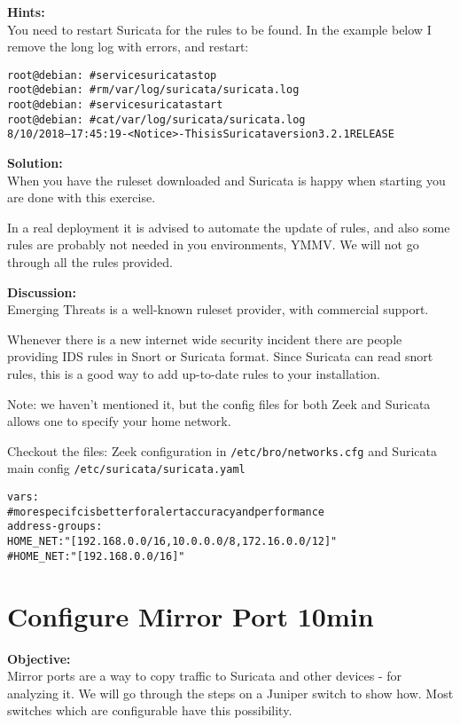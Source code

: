 \documentclass[a4paper,11pt,notitlepage]{report}
\begin{document}
{\bf Hints:}\\
You need to restart Suricata for the rules to be found. In the example below I remove the long log with errors, and restart:

\begin{alltt}\small
root@debian:~# service suricata stop
root@debian:~# rm /var/log/suricata/suricata.log
root@debian:~# service suricata start
root@debian:~# cat /var/log/suricata/suricata.log
8/10/2018 -- 17:45:19 - <Notice> - This is Suricata version 3.2.1 RELEASE
\end{alltt}

{\bf Solution:}\\
When you have the ruleset downloaded and Suricata is happy when starting you are done with this exercise.

In a real deployment it is advised to automate the update of rules, and also some rules are probably not needed in you environments, YMMV. We will not go through all the rules provided.

{\bf Discussion:}\\
Emerging Threats is a well-known ruleset provider, with commercial support.

Whenever there is a new internet wide security incident there are people providing IDS rules in Snort or Suricata format. Since Suricata can read snort rules, this is a good way to add up-to-date rules to your installation.

Note: we haven't mentioned it, but the config files for both Zeek and Suricata allows one to specify your home network.

Checkout the files: Zeek configuration in \verb+/etc/bro/networks.cfg+ and Suricata main config \verb+/etc/suricata/suricata.yaml+


\begin{alltt}\small
vars:
  # more specifc is better for alert accuracy and performance
  address-groups:
    HOME_NET: "[192.168.0.0/16,10.0.0.0/8,172.16.0.0/12]"
    #HOME_NET: "[192.168.0.0/16]"
\end{alltt}

\chapter{Configure Mirror Port 10min}
\label{ex:mirrorport}


{\bf Objective:} \\
Mirror ports are a way to copy traffic to Suricata and other devices - for analyzing it. We will go through the steps on a Juniper switch to show how.
Most switches which are configurable have this possibility.
\end{document}
